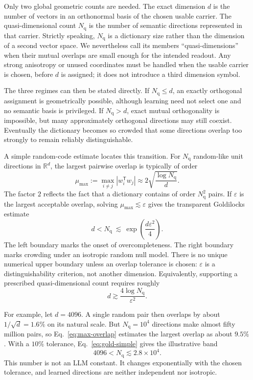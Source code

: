 \documentclass[
  aps,
  reprint,
  superscriptaddress,
  floatfix,
  nofootinbib,
  longbibliography
]{revtex4-2}
\newcommand{\R}{\mathbb{R}}
\newcommand{\Nq}{N_{\mathrm q}}
\newcommand{\T}{^{\mathsf{T}}}
\begin{document}
Only two global geometric counts are needed.  The exact dimension $d$ is the
number of vectors in an orthonormal basis of the chosen usable carrier.  The
quasi-dimensional count $\Nq$ is the number of semantic directions represented
in that carrier.  Strictly speaking, $\Nq$ is a dictionary size rather than the
dimension of a second vector space.  We nevertheless call its members
``quasi-dimensions'' when their mutual overlaps are small enough for the
intended readout.  Any strong anisotropy or unused coordinates must be handled
when the usable carrier is chosen, before $d$ is assigned; it does not introduce
a third dimension symbol.

The three regimes can then be stated directly.  If $\Nq\leq d$, an exactly
orthogonal assignment is geometrically possible, although learning need not
select one and no semantic basis is privileged.  If $\Nq>d$, exact mutual
orthogonality is impossible, but many approximately orthogonal directions may
still coexist.  Eventually the dictionary becomes so crowded that some
directions overlap too strongly to remain reliably distinguishable.

A simple random-code estimate locates this transition.  For $\Nq$ random-like
unit directions in $\R^d$, the largest pairwise overlap is typically of order
%
\begin{equation}
\label{eq:max-overlap}
\mu_{\max}
:=\max_{i\ne j}|w_i\T w_j|
\approx 2\sqrt{\frac{\log \Nq}{d}}.
\end{equation}
%
The factor $2$ reflects the fact that a dictionary contains of order
$\Nq^2$ pairs.  If $\varepsilon$ is the largest acceptable overlap, solving
$\mu_{\max}\lesssim\varepsilon$ gives the transparent Goldilocks estimate
%
\begin{equation}
\label{eq:gold-simple}
\boxed{
d<\Nq\ \lesssim\ \exp\!\left(\frac{d\varepsilon^2}{4}\right)
}.
\end{equation}
%
The left boundary marks the onset of overcompleteness.  The right boundary
marks crowding under an isotropic random null model.  There is no unique
numerical upper boundary unless an overlap tolerance is chosen:
$\varepsilon$ is a distinguishability criterion, not another dimension.
Equivalently, supporting a prescribed quasi-dimensional count requires roughly
%
\begin{equation}
\label{eq:d-needed}
d\gtrsim\frac{4\log\Nq}{\varepsilon^2}.
\end{equation}

For example, let $d=4096$.  A single random pair then overlaps by about
$1/\sqrt d=1.6\%$ on its natural scale.  But $\Nq=10^4$ directions make almost
fifty million pairs, so Eq.~\eqref{eq:max-overlap} estimates the largest overlap
as about $9.5\%$.  With a $10\%$ tolerance, Eq.~\eqref{eq:gold-simple} gives the
illustrative band
%
\begin{equation}
\label{eq:gold-example}
4096<\Nq\lesssim 2.8\times10^4.
\end{equation}
%
This number is not an LLM constant.  It changes exponentially with the chosen
tolerance, and learned directions are neither independent nor isotropic.
\end{document}
